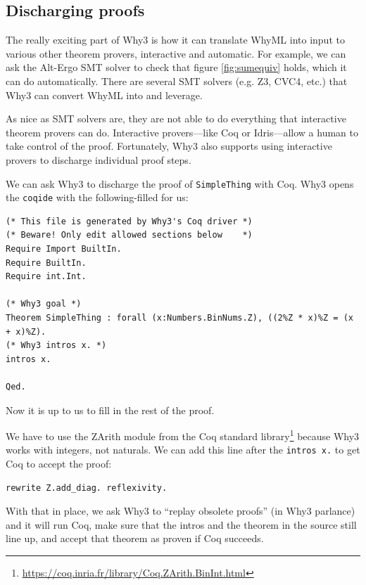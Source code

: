 \documentclass[12pt]{article}
\begin{document}

\subsection{Discharging proofs}

The really exciting part of Why3 is how it can translate WhyML into input to various other theorem provers, interactive and automatic.
For example, we can ask the Alt-Ergo SMT solver to check that figure \ref{fig:sumequiv} holds, which it can do automatically.
There are several SMT solvers (e.g. Z3, CVC4, etc.) that Why3 can convert WhyML into and leverage.


As nice as SMT solvers are, they are not able to do everything that interactive theorem provers can do.
Interactive provers---like Coq or Idris---allow a human to take control of the proof.
Fortunately, Why3 also supports using interactive provers to discharge individual proof steps.

We can ask Why3 to discharge the proof of \texttt{SimpleThing} with Coq.
Why3 opens the \texttt{coqide} with the following-filled for us:

\begin{verbatim}
(* This file is generated by Why3's Coq driver *)
(* Beware! Only edit allowed sections below    *)
Require Import BuiltIn.
Require BuiltIn.
Require int.Int.

(* Why3 goal *)
Theorem SimpleThing : forall (x:Numbers.BinNums.Z), ((2%Z * x)%Z = (x + x)%Z).
(* Why3 intros x. *)
intros x.

Qed.
\end{verbatim}

Now it is up to us to fill in the rest of the proof.

We have to use the ZArith module from the Coq standard library\footnote{\url{https://coq.inria.fr/library/Coq.ZArith.BinInt.html}} because Why3 works with integers, not naturals.
We can add this line after the \texttt{intros x.} to get Coq to accept the proof:

\begin{verbatim}
rewrite Z.add_diag. reflexivity.
\end{verbatim}

With that in place, we ask Why3 to ``replay obsolete proofs'' (in Why3 parlance) and it will run Coq, make sure that the intros and the theorem in the source still line up, and accept that theorem as proven if Coq succeeds.
\end{document}

